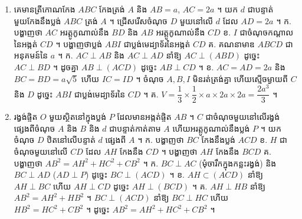 \begin{enumerate}[1]
  \item គេមានត្រីកោណកែង $ABC$ កែងត្រង់ $A$ និង $AB = a$, $AC = 2a$ ។ យក $d$ ជាបន្ទាត់មួយកែងនឹងប្លង់ $ABC$ ត្រង់ $A$ ។ ជ្រើសរើសចំណុច $D$ មួយនៅលើ $d$ ដែល $AD = 2a$ ។ \quad ក. បង្ហាញថា $AC$ អរត្តូកូណាល់នឹង $BD$ និង $AB$ អរត្តូកូណាល់នឹង $CD$ \quad ខ. $I$ ជាចំណុចកណ្ដាលនៃអង្កត់ $CD$ ។ បង្ហាញថាប្លង់ $ABI$ ជាប្លង់មេដ្យាទ័រនៃអង្កត់ $CD$ \quad គ. គណនាមាឌ $ABCD$ ជាអនុគមន៍នៃ $a$ ។
  \ans
  ក. $AC \perp AB$ និង $AC \perp AD$ នាំឱ្យ $AC \perp (ABD)$ ដូច្នេះ $AC \perp BD$ ។ ដូចគ្នា $AB \perp (ACD)$ ដូច្នេះ $AB \perp CD$ ។ \quad ខ. $AC = AD = 2a$ និង $BC = BD = a\sqrt{5}$ ហើយ $IC = ID$ ។ ចំណុច $A, B, I$ មិនរត់ត្រង់គ្នា ហើយស្មើចម្ងាយពី $C$ និង $D$ ដូច្នេះ $ABI$ ជាប្លង់មេដ្យាទ័រនៃ $CD$ ។ \quad គ. $V = \dfrac{1}{3}\times\dfrac{1}{2}\times a\times 2a\times 2a = \dfrac{2a^3}{3}$ ។
  \item រង្វង់ផ្ចិត $O$ មួយស្ថិតនៅក្នុងប្លង់ $P$ ដែលមានអង្កត់ផ្ចិត $AB$ ។ $C$ ជាចំណុចមួយនៅលើរង្វង់ផ្សេងពីចំណុច $A$ និង $B$ និង $d$ ជាបន្ទាត់កាត់តាម $A$ ហើយអរត្តូកូណាល់នឹងប្លង់ $P$ ។ យកចំណុច $D$ ឋិតនៅលើបន្ទាត់ $d$ ផ្សេងពី $A$ ។ \quad ក. បង្ហាញថា $BC$ កែងនឹងប្លង់ $ACD$ \quad ខ. $H$ ជាចំណុចមួយនៅលើ $CD$ ដែល $AH$ កែងនឹង $CD$ ។ បង្ហាញថា $AH$ កែងនឹង $BCD$ \quad គ. បង្ហាញថា $AB^2 = AH^2 + HC^2 + CB^2$ ។
  \ans
  ក. $BC \perp AC$ (មុំចារឹកក្នុងកន្លះរង្វង់) និង $BC \perp AD$ ($AD \perp P$) ដូច្នេះ $BC \perp (ACD)$ ។ \quad ខ. $AH \subset (ACD)$ នាំឱ្យ $AH \perp BC$ ហើយ $AH \perp CD$ ដូច្នេះ $AH \perp (BCD)$ ។ \quad គ. $AH \perp HB$ នាំឱ្យ $AB^2 = AH^2 + HB^2$ ។ $BC \perp (ACD)$ នាំឱ្យ $BC \perp HC$ ហើយ $HB^2 = HC^2 + CB^2$ ។ ដូច្នេះ $AB^2 = AH^2 + HC^2 + CB^2$ ។
\end{enumerate}
